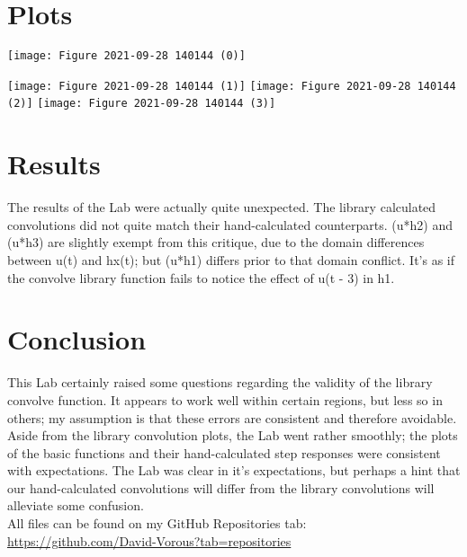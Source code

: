 \documentclass[12pt]{report}
\begin{document}
\section{Plots}
\begin{center}
    \texttt{[image: Figure 2021-09-28 140144 (0)]}
\end{center}
\text{}
\begin{center}
    \texttt{[image: Figure 2021-09-28 140144 (1)]}
    \texttt{[image: Figure 2021-09-28 140144 (2)]}
    \texttt{[image: Figure 2021-09-28 140144 (3)]}
\end{center}

\section{Results}

The results of the Lab were actually quite unexpected. The library calculated convolutions did not quite match their hand-calculated counterparts. (u*h2) and (u*h3) are slightly exempt from this critique, due to the domain differences between u(t) and hx(t); but (u*h1) differs prior to that domain conflict. It's as if the convolve library function fails to notice the effect of u(t - 3) in h1.

\section{Conclusion}

This Lab certainly raised some questions regarding the validity of the library convolve function. It appears to work well within certain regions, but less so in others; my assumption is that these errors are consistent and therefore avoidable. Aside from the library convolution plots, the Lab went rather smoothly; the plots of the basic functions and their hand-calculated step responses were consistent with expectations.
The Lab was clear in it's expectations, but perhaps a hint that our hand-calculated convolutions will differ from the library convolutions will alleviate some confusion.\\

All files can be found on my GitHub Repositories tab:\\
\url{https://github.com/David-Vorous?tab=repositories}
\end{document}
